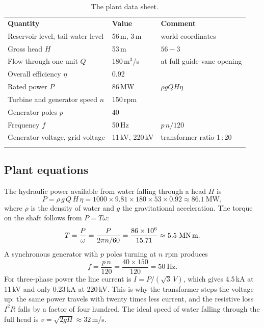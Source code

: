 \documentclass[11pt,a4paper]{report}
\newcommand{\thickhline}{\noalign{\global\setlength{\arrayrulewidth}{0.9pt}}\hline
                         \noalign{\global\setlength{\arrayrulewidth}{0.4pt}}}
\newcommand{\toprule}{\thickhline\noalign{\vskip 2pt}}
\newcommand{\midrule}{\noalign{\vskip 1pt}\hline\noalign{\vskip 2pt}}
\newcommand{\bottomrule}{\noalign{\vskip 1pt}\thickhline}
\begin{document}
\begin{table}[!htbp]
\centering
\caption{The plant data sheet.}
\label{tab:plant}
\begin{tabular}{@{}lll@{}}
\toprule
\textbf{Quantity} & \textbf{Value} & \textbf{Comment} \\
\midrule
Reservoir level, tail-water level & 56\,m, 3\,m & world coordinates \\
Gross head $H$ & 53\,m & $56-3$ \\
Flow through one unit $Q$ & 180\,m$^3$/s & at full guide-vane opening \\
Overall efficiency $\eta$ & 0.92 & \\
Rated power $P$ & 86\,MW & $\rho g Q H \eta$ \\
Turbine and generator speed $n$ & 150\,rpm & \\
Generator poles $p$ & 40 & \\
Frequency $f$ & 50\,Hz & $p\,n/120$ \\
Generator voltage, grid voltage & 11\,kV, 220\,kV & transformer ratio 1\,:\,20 \\
\bottomrule
\end{tabular}
\end{table}

\subsection{Plant equations}

The hydraulic power available from water falling through a head $H$ is
\begin{equation}
  P = \rho\, g\, Q\, H\, \eta = 1000 \times 9.81 \times 180 \times 53 \times 0.92
    \approx 86.1\ \text{MW},
  \label{eq:power}
\end{equation}
where $\rho$ is the density of water and $g$ the gravitational acceleration. The
torque on the shaft follows from $P = T\omega$:
\begin{equation}
  T = \frac{P}{\omega} = \frac{P}{2\pi n/60}
    = \frac{86\times10^{6}}{15.71} \approx 5.5\ \text{MN\,m}.
\end{equation}
A synchronous generator with $p$ poles turning at $n$ rpm produces~\cite{chapman}
\begin{equation}
  f = \frac{p\, n}{120} = \frac{40 \times 150}{120} = 50\ \text{Hz}.
  \label{eq:freq}
\end{equation}
For three-phase power the line current is $I = P/(\sqrt{3}\,V)$, which gives
4.5\,kA at 11\,kV and only 0.23\,kA at 220\,kV. This is why the transformer steps the
voltage up: the same power travels with twenty times less current, and the resistive
loss $I^2R$ falls by a factor of four hundred. The ideal speed of water falling through
the full head is $v=\sqrt{2gH}\approx 32$\,m/s.
\end{document}
